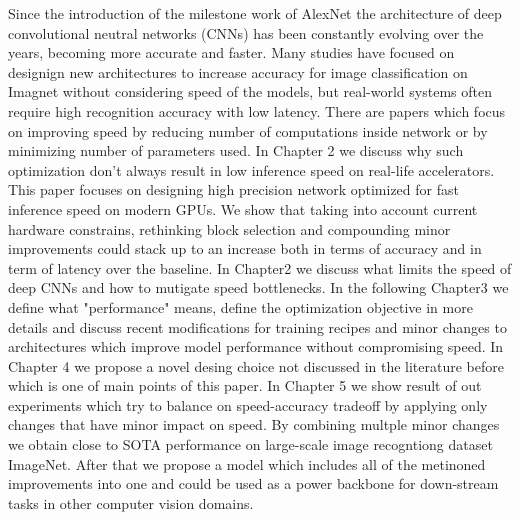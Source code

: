 Since the introduction of the milestone work of AlexNet \cite{alexnet??} the architecture of deep convolutional neutral networks (CNNs) has been constantly evolving over the years, becoming more accurate and faster. Many studies have focused on designign new architectures to increase accuracy for image classification on Imagnet without considering speed of the models, but real-world systems often require high recognition accuracy with low latency. There are papers which focus on improving speed by reducing number of computations inside network or by minimizing number of parameters used. In Chapter 2 we discuss why such optimization don't always result in low inference speed on real-life accelerators. 
This paper focuses on designing high precision network optimized for fast inference speed on modern GPUs. We show that taking into account current hardware constrains, rethinking block selection and compounding minor improvements could stack up to an increase both in terms of accuracy and in term of latency over the baseline.
In Chapter2 we discuss what limits the speed of deep CNNs and how to mutigate speed bottlenecks. In the following Chapter3 we define what "performance" means, define the optimization objective in more details and discuss recent modifications for training recipes and minor changes to architectures which improve model performance without compromising speed. In Chapter 4 we propose a novel desing choice not discussed in the literature before which is one of main points of this paper. In Chapter 5 we show result of out experiments which try to balance on speed-accuracy tradeoff by applying only changes that have minor impact on speed. By combining multple minor changes we obtain close to SOTA performance on large-scale image recogntiong dataset ImageNet. After that we propose a model which includes all of the metinoned improvements into one and could be used as a power backbone for down-stream tasks in other computer vision domains.




